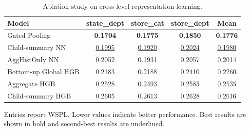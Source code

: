 \begin{table}[H]
\centering
\caption{Ablation study on cross-level representation learning.}
\label{tab:ablation}
\begin{threeparttable}
\begin{tabular}{lcccc}
\toprule
Model & state\_dept & store\_cat & store\_dept & Mean \\
\midrule
Gated Pooling & \textbf{0.1704} & \textbf{0.1775} & \textbf{0.1850} & \textbf{0.1776} \\
Child-summary NN & \underline{0.1995} & \underline{0.1920} & \underline{0.2024} & \underline{0.1980} \\
AggHistOnly NN & 0.2052 & 0.1931 & 0.2057 & 0.2014 \\
Bottom-up Global HGB & 0.2183 & 0.2188 & 0.2410 & 0.2260 \\
Aggregate HGB & 0.2528 & 0.2493 & 0.2585 & 0.2535 \\
Child-summary HGB & 0.2605 & 0.2613 & 0.2628 & 0.2616 \\
\bottomrule
\end{tabular}
\begin{tablenotes}
\footnotesize \item Entries report WSPL. Lower values indicate better performance. Best results are shown in bold and second-best results are underlined.
\end{tablenotes}
\end{threeparttable}
\end{table}
